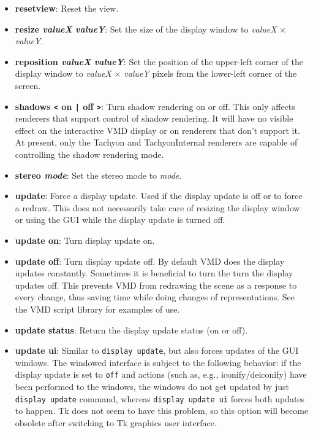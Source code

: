 \begin{itemize}
\item {\bf  resetview}: Reset the view. 

\item {\bf  resize {\it valueX} {\it valueY}}: Set the size of the
    display window to {\it valueX} $\times$ {\it valueY}.

\item {\bf  reposition {\it valueX} {\it valueY}}: Set the position of
    the upper-left corner of the display window to {\it valueX} $\times$
    {\it valueY} pixels from the lower-left corner of the screen.

\item {\bf  shadows {\tt <}  on {\tt |} off {\tt >}}: 
    Turn shadow rendering on or off.  This only affects renderers
    that support control of shadow rendering.  It will have no visible effect
    on the interactive VMD display or on renderers that don't support it.
    At present, only the Tachyon and TachyonInternal renderers are capable
    of controlling the shadow rendering mode.

\item {\bf  stereo {\it mode}}: Set the stereo mode to {\it mode}.

\item {\bf update}: Force a display update. Used if the display 
  update is off or to force a redraw. This does not necessarily take care 
  of resizing the display window or using the GUI while the display 
  update is turned off.
\item {\bf update on}: Turn display update on. 
\item {\bf update off}: Turn display update off. By default VMD does the
  display updates constantly. Sometimes it is beneficial to turn the turn
  the display updates off. This prevents VMD from redrawing the scene 
  as a response to every change, thus saving time while doing changes of 
  representations.  See the VMD script library for examples of use.
\item {\bf update status}: Return the display update status (on or off).
\item {\bf update ui}: Similar to {\tt display update}, but also forces
  updates of the GUI windows. The windowed interface is subject to the
  following behavior: if the display update is set to {\tt off} and 
  actions (such as, e.g., iconify/deiconify)
  have been performed to the windows, the windows do not get updated 
  by just {\tt display update} command, whereas {\tt display update ui}
  forces both updates to happen. Tk does not seem to have this problem,
  so this option will become obsolete after switching to Tk graphics user
  interface. 


\end{itemize}

